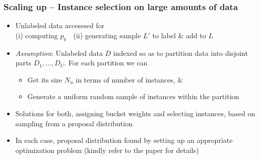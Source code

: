 \documentclass[11pt]{beamer}
\newcommand{\wt}{{p}}
\newlength{\wideitemsep}
\let\olditem\item
\renewcommand{\item}{\setlength{\itemsep}{\wideitemsep}\olditem}
\begin{document}
\begin{frame}
\frametitle{Scaling up -- Instance selection on large amounts of data} 
\begin{itemize}
\pause
\item Unlabeled data accesesed for \\ (i) computing $\wt_b~~~$ (ii) generating sample $L'$ to label \& add to $L$
\vspace{1mm}
\pause
\item \textit{Assumption}: Unlabeled data $D$ indexed so as to partition data into disjoint parts $D_1,\ldots,D_U$. For each partition we can 
\begin{itemize}
\item Get its size $N_u$ in terms of number of instances, \& \vspace{-1.5mm}
\item Generate a uniform random sample of instances within the partition
\end{itemize}
\vspace{1mm} \pause
\item Solutions for both, assigning bucket weights and selecting instances, based on sampling from a proposal distribution
\vspace{1mm} \pause
\item In each case, proposal distribution found by setting up an appropriate optimization problem (kindly refer to the paper for details)
\end{itemize}
\end{frame}

\end{document}
